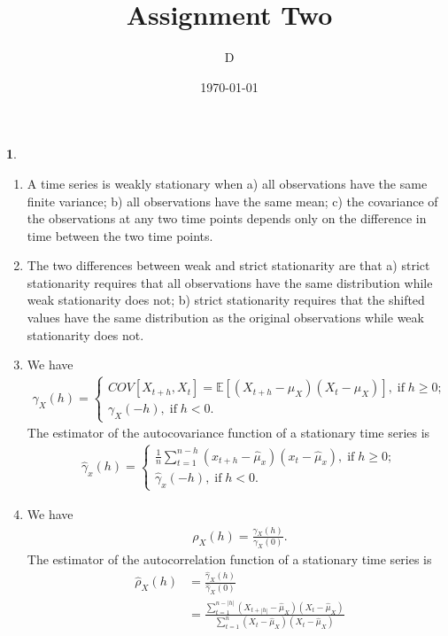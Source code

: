 \documentclass[10pt]{article}
\author{D}
\newtheorem{prob}{\bm{$Problem$}}
\begin{document}
\title{Assignment Two}
\date{\today}
\maketitle
\thispagestyle{fancy}
\thispagestyle{fancy}

\begin{prob}
\end{prob}
\begin{enumerate}[1)]
\vspace{3mm}

\item
A time series is weakly stationary when
\subitem
a) all observations have the same finite variance;
\subitem
b) all observations have the same mean;
\subitem
c) the covariance of the observations at any two time points depends only on the difference in time between the two time points.
\vspace{3mm}

\item
The two differences between weak and strict stationarity are that
\subitem
a) strict stationarity requires that all observations have the same distribution while weak stationarity does not;
\subitem
b) strict stationarity requires that the shifted values have the same distribution as the original observations while weak stationarity does not. %
\vspace{3mm}

\item
We have
\begin{align*}
\gamma_X(h)=\left\{\begin{array}{ll}COV[X_{t+h},X_t]=\mathbb{E}[(X_{t+h}-\mu_X)(X_t-\mu_X)],\;\textrm{if}\;h\geq0;\\
\gamma_X(-h),\;\textrm{if}\;h<0.\end{array}\right.
\end{align*}
The estimator of the autocovariance function of a stationary time series is
\begin{align*}
\hat{\gamma}_x(h)=\left\{\begin{array}{ll}\frac{1}{n}\sum^{n-h}_{t=1}(x_{t+h}-\hat{\mu}_x)(x_t-\hat{\mu}_x),\;\textrm{if}\;h\geq0;\\
\hat{\gamma}_x(-h),\;\textrm{if}\;h<0.\end{array}\right.
\end{align*}
\vspace{3mm}

\item
We have
\begin{align*}
\rho_X(h)=\frac{\gamma_X(h)}{\gamma_X(0)}.
\end{align*}
The estimator of the autocorrelation function of a stationary time series is
\begin{align*}
\hat{\rho}_X(h)&=\frac{\hat{\gamma}_X(h)}{\hat{\gamma}_X(0)}\\
&=\frac{\sum^{n-|h|}_{t=1}(X_{t+|h|}-\hat{\mu}_X)(X_t-\hat{\mu}_X)}{\sum^{n}_{t=1}(X_t-\hat{\mu}_X)(X_t-\hat{\mu}_X)}
\end{align*}

\end{enumerate}
\vspace{3mm}
\end{document}
